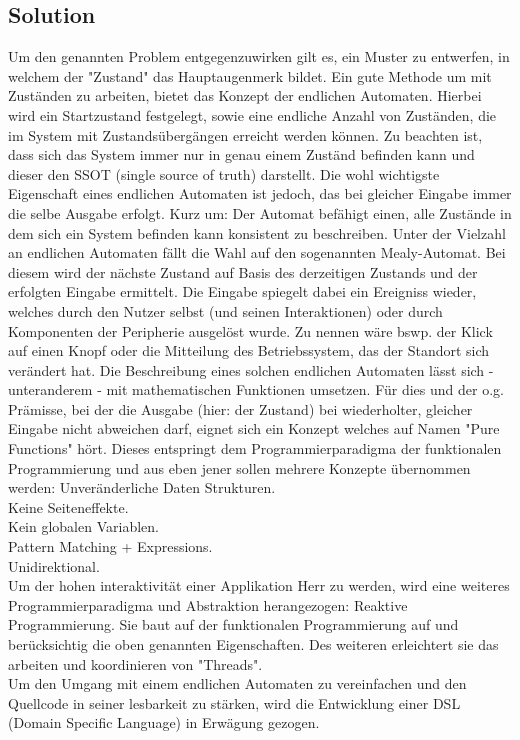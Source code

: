 \subsection{Solution}
\label{subsec:solution}




Um den genannten Problem entgegenzuwirken gilt es, ein Muster zu entwerfen,
in welchem der "Zustand" das Hauptaugenmerk bildet.
Ein gute Methode um mit Zuständen zu arbeiten, bietet das Konzept der endlichen Automaten.
Hierbei wird ein Startzustand festgelegt, sowie eine endliche Anzahl von Zuständen, die im System mit
Zustandsübergängen erreicht werden können. Zu beachten ist, dass sich das System immer nur in genau
einem Zuständ befinden kann und dieser den SSOT (single source of truth) darstellt.
Die wohl wichtigste Eigenschaft eines endlichen Automaten ist jedoch, das bei gleicher Eingabe
immer die selbe Ausgabe erfolgt.
Kurz um: Der Automat befähigt einen, alle Zustände in dem sich ein System befinden kann
konsistent zu beschreiben. 
Unter der Vielzahl an endlichen Automaten fällt die Wahl auf den sogenannten Mealy-Automat.
Bei diesem wird der nächste Zustand auf Basis des derzeitigen Zustands und der erfolgten Eingabe ermittelt.
Die Eingabe spiegelt dabei ein Ereigniss wieder, welches durch den Nutzer selbst (und seinen Interaktionen) 
oder durch Komponenten der Peripherie ausgelöst wurde. Zu nennen wäre bswp. 
der Klick auf einen Knopf oder die Mitteilung des Betriebssystem, das der Standort sich verändert hat.
Die Beschreibung eines solchen endlichen Automaten lässt sich - unteranderem - mit
mathematischen Funktionen umsetzen. Für dies und der o.g. Prämisse, bei der die Ausgabe (hier: der Zustand) bei wiederholter,
gleicher Eingabe nicht abweichen darf, eignet sich ein Konzept welches auf Namen "Pure Functions" hört.
Dieses entspringt dem Programmierparadigma der funktionalen Programmierung und aus eben jener sollen mehrere Konzepte übernommen werden:
Unveränderliche Daten Strukturen. \\
Keine Seiteneffekte. \\
Kein globalen Variablen. \\
Pattern Matching + Expressions. \\
Unidirektional.\\
Um der hohen interaktivität einer Applikation Herr zu werden, wird eine weiteres Programmierparadigma und
Abstraktion herangezogen: Reaktive Programmierung.
Sie baut auf der funktionalen Programmierung auf und berücksichtig die oben genannten Eigenschaften.
Des weiteren erleichtert sie das arbeiten und koordinieren von "Threads". 
\\
Um den Umgang mit einem endlichen Automaten zu vereinfachen und den Quellcode in seiner lesbarkeit zu stärken,
wird die Entwicklung einer DSL (Domain Specific Language) in Erwägung gezogen.


